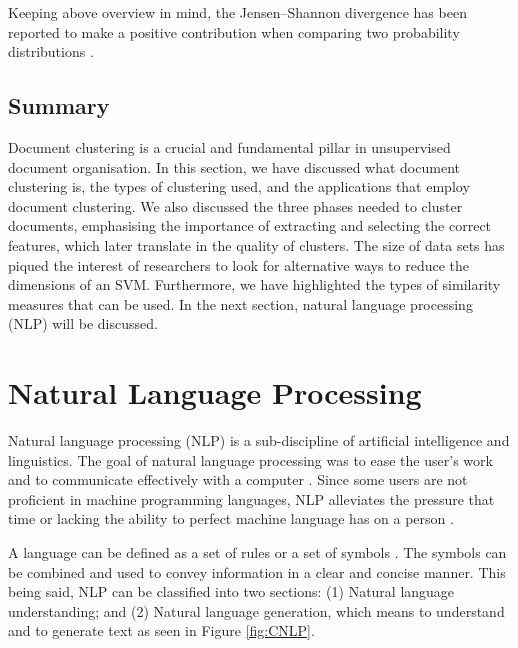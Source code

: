 Keeping above overview in mind, the Jensen–Shannon divergence has been reported to make a positive contribution when comparing two probability distributions \cite{Uto2017,9358561}.

\subsection{Summary}

Document clustering is a crucial and fundamental pillar in unsupervised document organisation. In this section, we have discussed what document clustering is, the types of clustering used, and the applications that employ document clustering. We also discussed the three phases needed to cluster documents, emphasising the importance of extracting and selecting the correct features, which later translate in the quality of clusters. The size of data sets has piqued the interest of researchers to look for alternative ways to reduce the dimensions of an SVM. Furthermore, we have highlighted the types of similarity measures that can be used. In the next section, natural language processing (NLP) will be discussed.

\section{Natural Language Processing} \label{secc:LDAover}

Natural language processing (NLP) is a sub-discipline of artificial intelligence and linguistics. The goal of natural language processing was to ease the user’s work and to communicate effectively with a computer \cite{khurana2017natural}. Since some users are not proficient in machine programming languages, NLP alleviates the pressure that time or lacking the ability to perfect machine language has on a person \cite{russell2016artificial}.

A language can be defined as a set of rules or a set of symbols \cite{santana2016language}. The symbols can be combined and used to convey information in a clear and concise manner. This being said, NLP can be classified into two sections: (1) Natural language understanding; and (2) Natural language
generation, which means to understand and to generate text as seen in Figure
\ref{fig:CNLP}.

